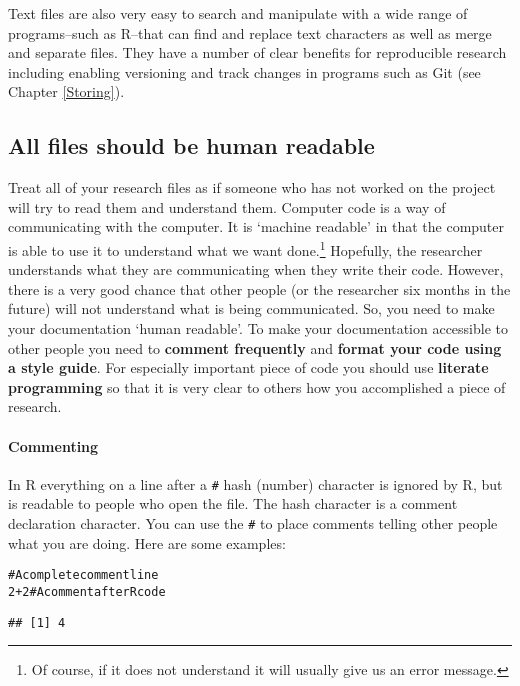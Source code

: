 \documentclass[ChapterTOCs,krantz1]{krantz}\usepackage{graphicx, color}
\makeatletter
\newcommand{\hlcomment}[1]{\textcolor[rgb]{0.180392156862745,0.6,0.341176470588235}{#1}}%
\newenvironment{kframe}{%
 \def\at@end@of@kframe{}%
 \ifinner\ifhmode%
  \def\at@end@of@kframe{\end{minipage}}%
  \begin{minipage}{\columnwidth}%
 \fi\fi%
 \def\FrameCommand##1{\hskip\@totalleftmargin \hskip-\fboxsep
 \colorbox{shadecolor}{##1}\hskip-\fboxsep
     \hskip-\linewidth \hskip-\@totalleftmargin \hskip\columnwidth}%
 \MakeFramed {\advance\hsize-\width
   \@totalleftmargin\z@ \linewidth\hsize
   \@setminipage}}%
 {\par\unskip\endMakeFramed%
 \at@end@of@kframe}
\newenvironment{knitrout}{}{} %
\makeatother
\begin{document}
Text files are also very easy to search and manipulate with a wide range of programs--such as R--that can find and replace text characters as well as merge and separate files. They have a number of clear benefits for reproducible research including enabling versioning and track changes in programs such as Git (see Chapter \ref{Storing}).   

\subsection{All files should be human readable}

Treat all of your research files as if someone who has not worked on the project will try to read them and understand them. Computer code is a way of communicating with the computer. It is `machine readable' in that the computer is able to use it to understand what we want done.\footnote{Of course, if it does not understand it will usually give us an error message.} Hopefully, the researcher understands what they are communicating when they write their code. However, there is a very good chance that other people (or the researcher six months in the future) will not understand what is being communicated. So, you need to make your documentation `human readable'. To make your documentation accessible to other people you need to {\bf{comment frequently}} and {\bf{format your code using a style guide}}. For especially important piece of code you should use {\bf{literate programming}} so that it is very clear to others how you accomplished a piece of research.

\paragraph{Commenting}
In R everything on a line after a {\tt{\#}} hash (number) character is ignored by R, but is readable to people who open the file. The hash character is a comment declaration character. You can use the {\tt{\#}} to place comments telling other people what you are doing. Here are some examples:

\begin{knitrout}
\color{fgcolor}\begin{kframe}
\begin{alltt}
\hlcomment{# A complete comment line}
2 + 2  \hlcomment{# A comment after R code}
\end{alltt}
\begin{verbatim}
## [1] 4
\end{verbatim}
\end{kframe}
\end{knitrout}
\end{document}
